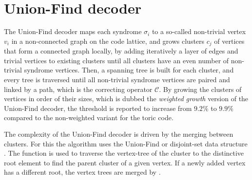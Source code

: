 \section{Union-Find decoder}\label{sec:unionfind}

The Union-Find decoder \cite{delfosse2017linear, delfosse2017almost} maps each syndrome $\sigma_i$ to a so-called non-trivial vertex $v_i$ in a non-connected graph on the code lattice, and grows clusters $c_j$ of vertices that form a connected graph locally, by adding iteratively a layer of edges and trivial vertices to existing clusters until all clusters have an even number of non-trivial syndrome vertices. Then, a spanning tree is built for each cluster, and every tree is traversed until all non-trivial syndrome vertices are paired and linked by a path, which is the correcting operator $\mathcal{C}$. By growing the clusters of vertices in order of their sizes, which is dubbed the \emph{weighted growth} version of the Union-Find decoder, the threshold is reported to increase from $9.2\%$ to $9.9\%$ compared to the non-weighted variant for the toric code. 

The complexity of the Union-Find decoder is driven by the merging between clusters. For this the algorithm uses the Union-Find or disjoint-set data structure \cite{tarjan1975efficiency}. The function  is used to traverse the vertex-tree of the cluster to the distinctive root element to find the parent cluster of a given vertex. If a newly added vertex has a different root, the vertex trees are merged by . 